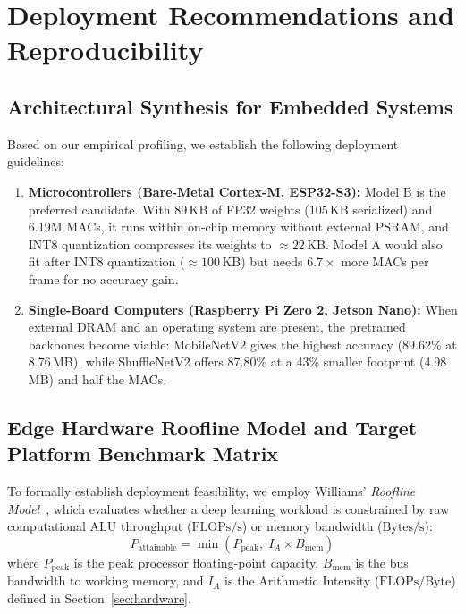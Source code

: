 \documentclass[11pt,a4paper]{article}
\begin{document}
\section{Deployment Recommendations and Reproducibility}
\label{sec:conclusion}

\subsection{Architectural Synthesis for Embedded Systems}
Based on our empirical profiling, we establish the following deployment guidelines:
\begin{enumerate}[leftmargin=*,itemsep=1pt]
  \item \textbf{Microcontrollers (Bare-Metal Cortex-M, ESP32-S3):} Model B is the preferred candidate. With 89\,KB of FP32 weights (105\,KB serialized) and 6.19M MACs, it runs within on-chip memory without external PSRAM, and INT8 quantization compresses its weights to $\approx 22$\,KB. Model A would also fit after INT8 quantization ($\approx 100$\,KB) but needs $6.7\times$ more MACs per frame for no accuracy gain.
  \item \textbf{Single-Board Computers (Raspberry Pi Zero 2, Jetson Nano):} When external DRAM and an operating system are present, the pretrained backbones become viable: MobileNetV2 gives the highest accuracy (89.62\% at 8.76\,MB), while ShuffleNetV2 offers 87.80\% at a 43\% smaller footprint (4.98\,MB) and half the MACs.
\end{enumerate}

\subsection{Edge Hardware Roofline Model and Target Platform Benchmark Matrix}
To formally establish deployment feasibility, we employ Williams' \textit{Roofline Model}~\cite{roofline}, which evaluates whether a deep learning workload is constrained by raw computational ALU throughput ($\text{FLOPs/s}$) or memory bandwidth ($\text{Bytes/s}$):
\begin{equation}
  P_{\text{attainable}} = \min\left( P_{\text{peak}}, \; I_A \times B_{\text{mem}} \right)
\end{equation}
where $P_{\text{peak}}$ is the peak processor floating-point capacity, $B_{\text{mem}}$ is the bus bandwidth to working memory, and $I_A$ is the Arithmetic Intensity ($\text{FLOPs/Byte}$) defined in Section~\ref{sec:hardware}.
\end{document}
